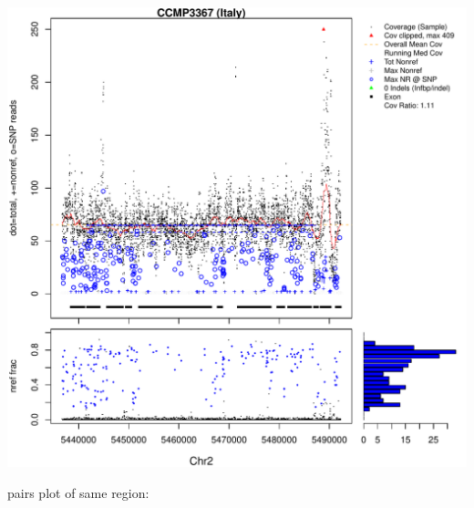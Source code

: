 \documentclass{article}\usepackage[]{graphicx}\usepackage[]{color}
\makeatletter
\def\maxwidth{ %
  \ifdim\Gin@nat@width>\linewidth
    \linewidth
  \else
    \Gin@nat@width
  \fi
}
\newenvironment{knitrout}{}{} %
\makeatother
\begin{document}
\begin{knitrout}
{\includegraphics[width=\maxwidth]{figs-knitr/unnamed-chunk-35-7} 

}



\end{knitrout}

pairs plot of same region:
\end{document}
